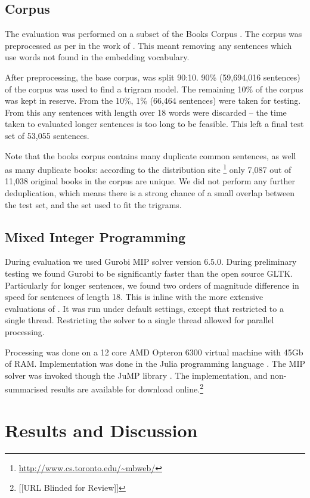 \documentclass[11pt]{article}
\theoremstyle{plain}
\theoremstyle{definition}
\begin{document}
\subsection{Corpus}
The evaluation was performed on a subset of the Books Corpus \parencite{moviebook}. The corpus was preprocessed as per in the work of \textcite{White2015BOWgen}. This meant removing any sentences which use words not found in the embedding vocabulary.

After preprocessing, the base corpus, was split 90:10. 90\% (59,694,016 sentences) of the corpus was used to find a trigram model. The remaining 10\% of the corpus was kept in reserve. From the 10\%, 1\% (66,464 sentences) were taken for testing. From this any sentences with length over 18 words were discarded -- the time taken to evaluated longer sentences is too long to be feasible. This left a final test set of 53,055 sentences.
 
Note that the books corpus contains many duplicate common sentences, as well as many duplicate books: according to the distribution site \footnote{\url{http://www.cs.toronto.edu/~mbweb/}} only 7,087 out of 11,038 original books in the corpus are unique. We did not perform any further deduplication, which means there is a strong chance of a small overlap between the test set, and the set used to fit the trigrams.
 

\subsection{Mixed Integer Programming}
During evaluation we used Gurobi MIP solver version 6.5.0. During preliminary testing we found Gurobi to be significantly faster than the open source GLTK. Particularly for longer sentences, we found two orders of magnitude difference in speed for sentences of length 18. This is inline with the more extensive evaluations of \textcite{meindl2012analysis}. It was run under default settings, except that restricted to a single thread.
Restricting the solver to a single thread allowed for parallel processing.

Processing was done on a 12 core AMD Opteron 6300 virtual machine with 45Gb of RAM. Implementation was done in the Julia programming language \parencite{Julia}. The MIP solver was invoked though the JuMP library \parencite{jump}. The implementation, and non-summarised results are available for download online.\footnote{[[URL Blinded for Review]]}



\section{Results and Discussion} \label{results}
\end{document}
